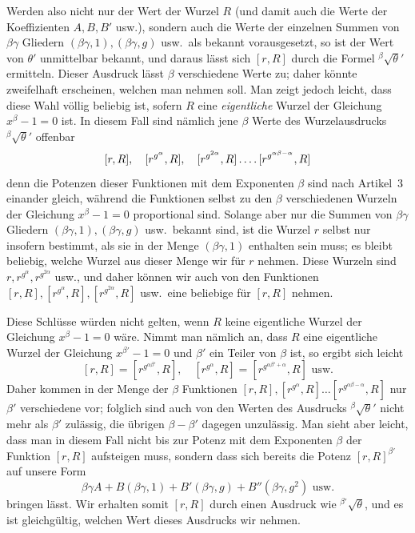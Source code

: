 Werden also nicht nur der Wert der Wurzel $R$ (und damit auch die Werte der Koeffizienten $A,B,B'$ usw.), sondern auch die Werte der einzelnen Summen von $\beta\gamma$ Gliedern $(\beta\gamma,1),(\beta\gamma,g)$ usw.\ als bekannt vorausgesetzt, so ist der Wert von $\theta'$ unmittelbar bekannt, und daraus lässt sich $[r,R]$ durch die Formel ${}^{\beta}\!\surd\theta'$ ermitteln. Dieser Ausdruck lässt $\beta$ verschiedene Werte zu; daher könnte zweifelhaft erscheinen, welchen man nehmen soll. Man zeigt jedoch leicht, dass diese Wahl völlig beliebig ist, sofern $R$ eine \emph{eigentliche} Wurzel der Gleichung $x^\beta-1=0$ ist. In diesem Fall sind nämlich jene $\beta$ Werte des Wurzelausdrucks ${}^{\beta}\!\surd\theta'$ offenbar
\[
[r,R],\quad[r^{g^\alpha},R],\quad[r^{g^{2\alpha}},R]\mathinner{.\,.\,.\,.}[r^{g^{\alpha\beta-\alpha}},R]
\]
denn die Potenzen dieser Funktionen mit dem Exponenten $\beta$ sind nach Artikel~3 einander gleich, während die Funktionen selbst zu den $\beta$ verschiedenen Wurzeln der Gleichung $x^\beta-1=0$ proportional sind. Solange aber nur die Summen von $\beta\gamma$ Gliedern $(\beta\gamma,1),(\beta\gamma,g)$ usw.\ bekannt sind, ist die Wurzel $r$ selbst nur insofern bestimmt, als sie in der Menge $(\beta\gamma,1)$ enthalten sein muss; es bleibt beliebig, welche Wurzel aus dieser Menge wir für $r$ nehmen. Diese Wurzeln sind $r,r^{g^\alpha},r^{g^{2\alpha}}$ usw., und daher können wir auch von den Funktionen $[r,R],[r^{g^\alpha},R],[r^{g^{2\alpha}},R]$ usw.\ eine beliebige für $[r,R]$ nehmen.

Diese Schlüsse würden nicht gelten, wenn $R$ keine eigentliche Wurzel der Gleichung $x^\beta-1=0$ wäre. Nimmt man nämlich an, dass $R$ eine eigentliche Wurzel der Gleichung $x^{\beta'}-1=0$ und $\beta'$ ein Teiler von $\beta$ ist, so ergibt sich leicht
\[
[r,R]=[r^{g^{\alpha\beta'}},R],\quad[r^{g^\alpha},R]=[r^{g^{\alpha\beta'+\alpha}},R]\text{ usw.}
\]
Daher kommen in der Menge der $\beta$ Funktionen $[r,R],[r^{g^\alpha},R]\ldots[r^{g^{\alpha\beta-\alpha}},R]$ nur $\beta'$ verschiedene vor; folglich sind auch von den Werten des Ausdrucks ${}^{\beta}\!\surd\theta'$ nicht mehr als $\beta'$ zulässig, die übrigen $\beta-\beta'$ dagegen unzulässig. Man sieht aber leicht, dass man in diesem Fall nicht bis zur Potenz mit dem Exponenten $\beta$ der Funktion $[r,R]$
aufsteigen muss, sondern dass sich bereits die Potenz $[r,R]^{\beta'}$ auf unsere Form
\[
\beta\gamma A+B(\beta\gamma,1)+B'(\beta\gamma,g)+B''(\beta\gamma,g^2)\text{ usw.}
\]
bringen lässt. Wir erhalten somit $[r,R]$ durch einen Ausdruck wie ${}^{\beta'}\!\surd\theta$, und es ist gleichgültig, welchen Wert dieses Ausdrucks wir nehmen.

